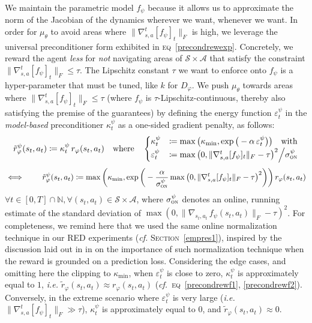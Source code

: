 We maintain the parametric model $f_\psi$
because it allows us to approximate the norm of the Jacobian of the dynamics
wherever we want, whenever we want.
In order for $\mu_\theta$ to avoid areas where $\lVert\nabla_{s,a}^t[f_\psi]_t\rVert _F$ is high,
we leverage the universal preconditioner form exhibited in \textsc{eq}~\ref{precondrewexp}.
Concretely, we reward the agent \emph{less} for
\emph{not} navigating areas of $\mathcal{S} \times \mathcal{A}$ that satisfy the constraint
$\lVert\nabla_{s,a}^t[f_\psi]_t\rVert _F \leq \tau$.
The Lipschitz constant $\tau$ we want to enforce onto $f_\psi$ is a hyper-parameter that must be tuned,
like $k$ for $D_\varphi$.
We push $\mu_\theta$ towards areas where $\lVert\nabla_{s,a}^t[f_\psi]_t\rVert _F \leq \tau$
(where $f_\psi$ is $\tau$-Lipschitz-continuous, thereby also satisfying the premise of the guarantees)
by defining the energy function $\varepsilon_t^\psi$ in the
\emph{model-based} preconditioner $\kappa_t^\psi$ as a one-sided gradient penalty, as follows:
\begin{align}
\tilde{r}_\varphi^\psi (s_t,a_t)
\coloneqq \kappa_t^\psi \, r_\varphi (s_t,a_t)
\quad \text{where} \quad
\begin{cases}
\kappa_t^\psi &\coloneqq \max\big(\kappa_\text{min}, \exp \big(-\alpha \, \varepsilon_t^\psi\big)\big)
\quad \text{with} \\
\varepsilon_t^\psi &\coloneqq
\max \big(0, \lVert\nabla_{s,a}^t[f_\psi]_t\rVert _F - \tau\big)^2 \Big/ \sigma_\textsc{on}^\psi
\end{cases}
\label{precondrewf1}
\end{align}
\begin{align}
\iff \qquad
\tilde{r}_\varphi^\psi(s_t,a_t)
\coloneqq \max\bigg(\kappa_\text{min}, \exp \bigg(- \frac{\alpha}{\sigma_\textsc{on}^\psi}
\max \big(0, \lVert\nabla_{s,a}^t[f_\psi]_t\rVert _F - \tau\big)^2\bigg)\bigg)
\, r_\varphi (s_t,a_t)
\label{precondrewf2}
\end{align}
$\forall t \in [0, T] \cap \mathbb{N},
\forall (s_t, a_t) \in \mathcal{S} \times \mathcal{A}$,
where
$\sigma_\textsc{on}^\psi$ denotes an online, running estimate of
the standard deviation of
$\max (0, \lVert \nabla_{s_t,a_t} \, f_\psi (s_t,a_t) \rVert _F - \tau)^2$.
For completeness, we remind here that we used the same online normalization technique
in our RED experiments
(\textit{cf.} \textsc{Section}~\ref{empres1}),
inspired by the discussion laid out in in \cite{Burda2018-vl}
on the importance of such normalization technique
when the reward is grounded on a prediction loss.
Considering the edge cases, and omitting here the clipping to $\kappa_\text{min}$,
when $\varepsilon_t^\psi$ is close to zero,
$\kappa_t^\psi$ is approximately equal to $1$,
\textit{i.e.} $\tilde{r}_\varphi (s_t,a_t) \approx r_\varphi (s_t,a_t)$
(\textit{cf.}~\textsc{eq}~\ref{precondrewf1}, \ref{precondrewf2}).
Conversely, in the extreme scenario where $\varepsilon_t^\psi$ is very large
(\textit{i.e.}~$\lVert\nabla_{s,a}^t[f_\psi]_t\rVert _F \gg \tau$),
$\kappa_t^\psi$ is approximately equal to $0$,
and $\tilde{r}_\varphi (s_t,a_t) \approx 0$.

